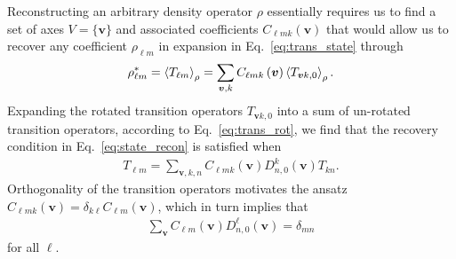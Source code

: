 \documentclass[notitlepage,twocolumn]{revtex4-2}
\newcommand{\p}[1]{\left(#1\right)} %
\newcommand{\bk}{\Braket} %
\renewcommand{\v}{\bm} %
\renewcommand{\set}[1]{\{#1\}} %
\begin{document}
Reconstructing an arbitrary density operator $\rho$ essentially requires us to find a set of axes $V=\set{\v v}$ and associated coefficients $C_{\ell mk}\p{\v v}$ that would allow us to recover any coefficient $\rho_{\ell m}$ in expansion in Eq.~\eqref{eq:trans_state} through
\begin{align}
  \rho_{\ell m}^* = \bk{T_{\ell m}}_\rho
  = \sum_{\v v,k} C_{\ell mk}\p{\v v} \bk{T_{\v vk,0}}_\rho.
  \label{eq:state_recon}
\end{align}
Expanding the rotated transition operators $T_{\v vk,0}$ into a sum of un-rotated transition operators, according to Eq.~\eqref{eq:trans_rot}, we find that the recovery condition in Eq.~\eqref{eq:state_recon} is satisfied when
\begin{align}
  T_{\ell m}
  = \sum_{\v v,k,n} C_{\ell mk}\p{\v v} D^k_{n,0}\p{\v v} T_{kn}.
\end{align}
Orthogonality of the transition operators motivates the ansatz $C_{\ell mk}\p{\v v}=\delta_{k\ell}C_{\ell m}\p{\v v}$, which in turn implies that
\begin{align}
  \sum_{\v v} C_{\ell m}\p{\v v} D^\ell_{n,0}\p{\v v} = \delta_{mn}
  \label{eq:tomo_recovery}
\end{align}
for all $\ell$.
\end{document}
